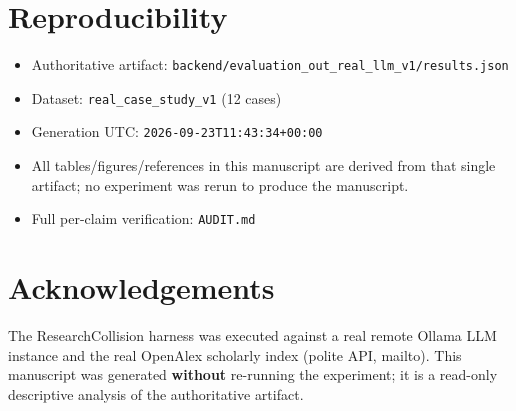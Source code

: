 \documentclass[11pt]{article}
\begin{document}
\section{Reproducibility}
\label{sec:repro}
\begin{itemize}
    \item Authoritative artifact: \texttt{backend/evaluation\_out\_real\_llm\_v1/results.json}
    \item Dataset: \texttt{real\_case\_study\_v1} (12 cases)
    \item Generation UTC: \texttt{2026-09-23T11:43:34+00:00}
    \item All tables/figures/references in this manuscript are derived from that
    single artifact; no experiment was rerun to produce the manuscript.
    \item Full per-claim verification: \texttt{AUDIT.md}
\end{itemize}

\section{Acknowledgements}
The ResearchCollision harness was executed against a real remote Ollama LLM
instance and the real OpenAlex scholarly index (polite API, mailto). This
manuscript was generated \textbf{without} re-running the experiment; it is a
read-only descriptive analysis of the authoritative artifact.



\end{document}
